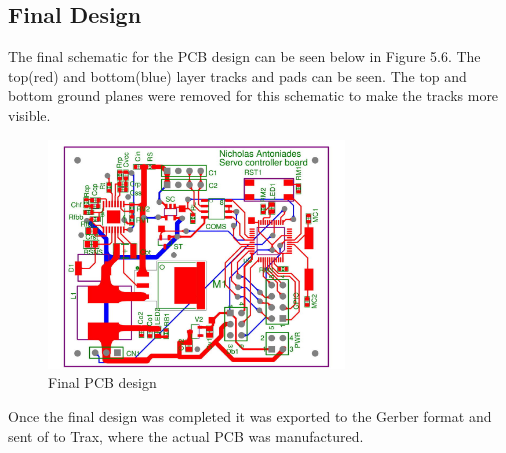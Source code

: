 \subsection{Final Design}
\vspace{-5mm}
The final schematic for the PCB design can be seen below in Figure 5.6. The top(red) and bottom(blue) layer tracks and pads can be seen. The top and bottom ground planes were removed for this schematic to make the tracks more visible.
\vspace{-2mm}
\begin{figure}[H]
\centering
\includegraphics[width=0.7\textwidth]{Final_PCB.jpg}
\caption{Final PCB design}
\end{figure} 
\vspace{-10mm}
Once the final design was completed it was exported to the Gerber format and sent of to Trax, where the actual PCB was manufactured.

\vspace{-10mm}
